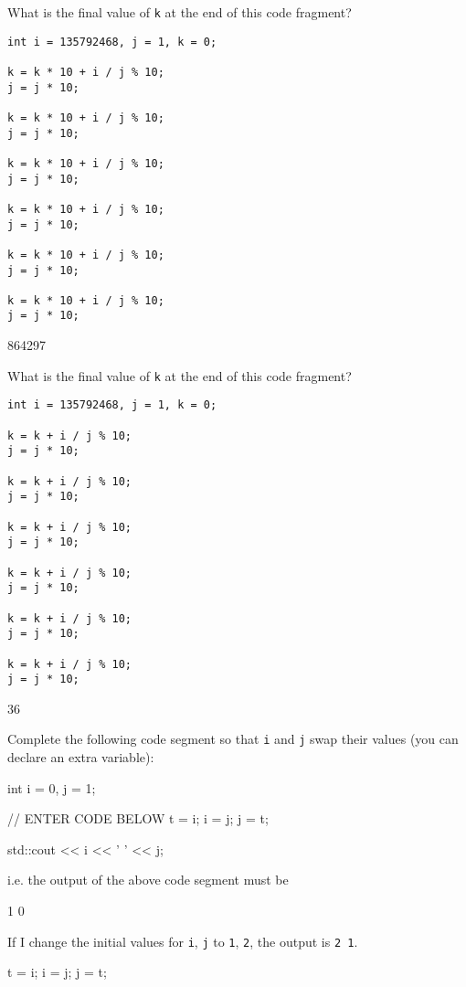\nextq
What is the final value of \verb!k! at the end of this code fragment?
\begin{Verbatim}[fontsize=\footnotesize,frame=single]
int i = 135792468, j = 1, k = 0;

k = k * 10 + i / j % 10;
j = j * 10;

k = k * 10 + i / j % 10;
j = j * 10;

k = k * 10 + i / j % 10;
j = j * 10;

k = k * 10 + i / j % 10;
j = j * 10;

k = k * 10 + i / j % 10;
j = j * 10;

k = k * 10 + i / j % 10;
j = j * 10;
\end{Verbatim}
\ANSWER
\begin{answercode}
864297
\end{answercode}

\nextq
What is the final value of \verb!k! at the end of this code fragment?
\begin{Verbatim}[fontsize=\footnotesize,frame=single]
int i = 135792468, j = 1, k = 0;

k = k + i / j % 10;
j = j * 10;

k = k + i / j % 10;
j = j * 10;

k = k + i / j % 10;
j = j * 10;

k = k + i / j % 10;
j = j * 10;

k = k + i / j % 10;
j = j * 10;

k = k + i / j % 10;
j = j * 10;
\end{Verbatim}
\ANSWER
\begin{answercode}
36
\end{answercode}

\nextq
Complete the following code segment so that
\verb!i! and \verb!j!
swap their values (you can declare an extra variable):
\begin{console}[fontsize=\footnotesize]
int i = 0, j = 1;

// ENTER CODE BELOW
t = i;
i = j;
j = t;

std::cout << i << ' ' << j;
\end{console}
i.e. the output of the above code segment must be
\begin{console}[fontsize=\footnotesize]
1 0
\end{console}
If I change the initial values for \verb!i!, \verb!j! to \verb!1!, \verb!2!,
the output is \verb!2 1!.
\\
\ANSWER
\begin{answercode}
t = i;
i = j;
j = t;
\end{answercode}

